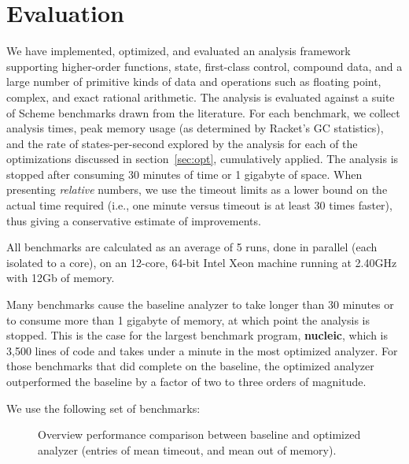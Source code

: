 \documentclass[preprint,onecolumn,9pt]{sigplanconf} %
\begin{document}
\section{Evaluation}
\label{sec:eval}

We have implemented, optimized, and evaluated an analysis framework supporting higher-order functions, state, first-class control, compound data, and a large number of primitive kinds of data and operations such as floating point, complex, and exact rational arithmetic.
%
The analysis is evaluated against a suite of Scheme benchmarks drawn from the literature.
%
For each benchmark, we collect analysis times, peak memory usage (as determined by Racket's GC statistics), and the rate of states-per-second explored by the analysis for each of the optimizations discussed in section~\ref{sec:opt}, cumulatively applied.
%
The analysis is stopped after consuming 30 minutes of time or 1 gigabyte of space.
%
When presenting \emph{relative} numbers, we use the timeout limits as a lower bound on the actual time required (i.e., one minute versus timeout is at least 30 times faster),
thus giving a conservative estimate of improvements.

All benchmarks are calculated as an average of 5 runs, done in
parallel (each isolated to a core), on an 12-core, 64-bit Intel Xeon machine running at 2.40GHz
with 12Gb of memory.

Many benchmarks cause the baseline analyzer to take longer than 30 minutes or to consume more than 1 gigabyte of memory, at which point the analysis is stopped.
%
This is the case for the largest benchmark program, {\bf nucleic}, which is 3,500 lines of code and takes under a minute in the most optimized analyzer.
%
For those benchmarks that did complete on the baseline, the optimized analyzer outperformed the baseline by a factor of two to three orders of magnitude.

We use the following set of benchmarks:
\begin{figure}
\centering

\caption{Overview performance comparison between baseline and
  optimized analyzer (entries of  mean timeout, and  mean out of memory).}
\label{fig:bench-overview}
\end{figure}
\end{document}
